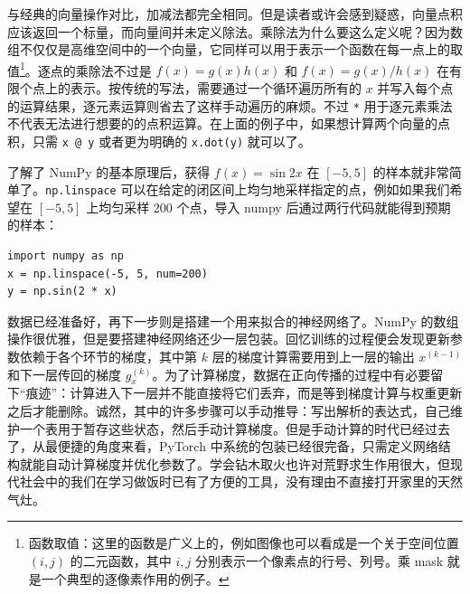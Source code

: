 与经典的向量操作对比，加减法都完全相同。但是读者或许会感到疑惑，向量点积应该返回一个标量，而向量间并未定义除法。乘除法为什么要这么定义呢？因为数组不仅仅是高维空间中的一个向量，它同样可以用于表示一个函数在每一点上的取值\footnote{函数取值：这里的函数是广义上的，例如图像也可以看成是一个关于空间位置 $(i, j)$ 的二元函数，其中 $i,j$ 分别表示一个像素点的行号、列号。乘 mask 就是一个典型的逐像素作用的例子。}。逐点的乘除法不过是 $f(x) = g(x) h(x)$ 和 $f(x) = g(x) / h(x)$ 在有限个点上的表示。按传统的写法，需要通过一个循环遍历所有的 $x$ 并写入每个点的运算结果，逐元素运算则省去了这样手动遍历的麻烦。不过 \texttt{*} 用于逐元素乘法不代表无法进行想要的的点积运算。在上面的例子中，如果想计算两个向量的点积，只需 \texttt{x @ y} 或者更为明确的 \texttt{x.dot(y)} 就可以了。

了解了 NumPy 的基本原理后，获得 $f(x) = \sin 2x$ 在 $[-5, 5]$ 的样本就非常简单了。\texttt{np.linspace} 可以在给定的闭区间上均匀地采样指定的点，例如如果我们希望在 $[-5, 5]$ 上均匀采样 200 个点，导入 numpy 后通过两行代码就能得到预期的样本：
\begin{verbatim}
import numpy as np
x = np.linspace(-5, 5, num=200)
y = np.sin(2 * x)
\end{verbatim}

数据已经准备好，再下一步则是搭建一个用来拟合的神经网络了。NumPy 的数组操作很优雅，但是要搭建神经网络还少一层包装。回忆训练的过程便会发现更新参数依赖于各个环节的梯度，其中第 $k$ 层的梯度计算需要用到上一层的输出 $x^{(k - 1)}$ 和下一层传回的梯度 $g_x^{(k)}$。为了计算梯度，数据在正向传播的过程中有必要留下“痕迹”：计算进入下一层并不能直接将它们丢弃，而是等到梯度计算与权重更新之后才能删除。诚然，其中的许多步骤可以手动推导：写出解析的表达式，自己维护一个表用于暂存这些状态，然后手动计算梯度。但是手动计算的时代已经过去了，从最便捷的角度来看，PyTorch 中系统的包装已经很完备，只需定义网络结构就能自动计算梯度并优化参数了。学会钻木取火也许对荒野求生作用很大，但现代社会中的我们在学习做饭时已有了方便的工具，没有理由不直接打开家里的天然气灶。

